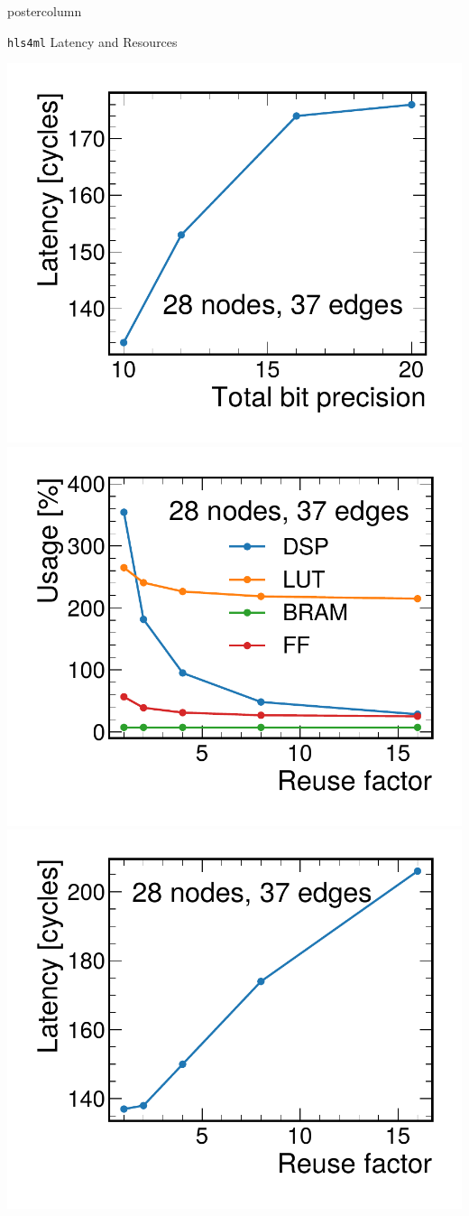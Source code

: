 \documentclass[final,hyperref={pdfpagelabels=false}]{beamer}
\newcommand{\hlsfml}{{\texttt{hls4ml}}\xspace}
\begin{document}
\begin{frame}
\begin{columns}
\begin{column}{.49\textwidth}
\begin{beamercolorbox}[center,wd=\textwidth]{postercolumn}
\begin{minipage}[T]{.95\textwidth}
{\begin{block}{{\hlsfml} Latency and Resources}
\begin{itemize}
\begin{center}
                    \includegraphics[width=0.33\linewidth]{Latency_vs_BP.pdf}
                    \includegraphics[width=0.33\linewidth]{Resources_vs_RF.pdf}
                    \includegraphics[width=0.33\linewidth]{Latency_vs_RF.pdf}
                \end{center}
              \end{itemize}
            \end{block}
            
}
\end{minipage}
\end{beamercolorbox}
\end{column}
\end{columns}
\end{frame}
\end{document}
